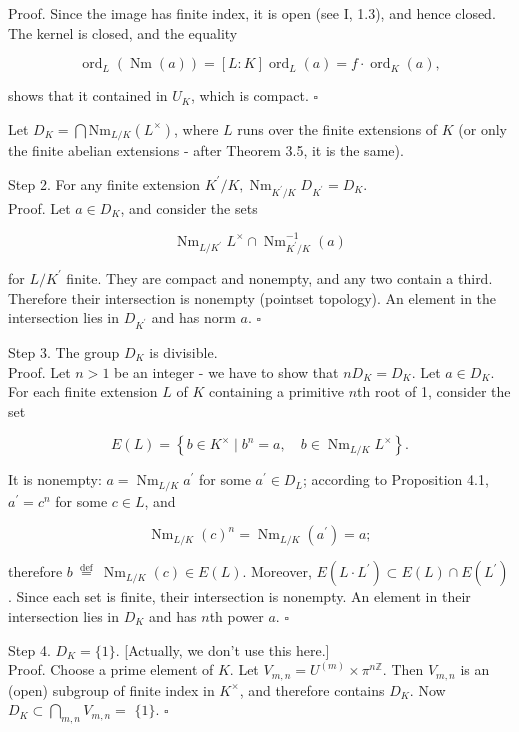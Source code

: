 \documentclass[10pt]{article}
\begin{document}
Proof. Since the image has finite index, it is open (see I, 1.3), and hence closed. The kernel is closed, and the equality

$$
\operatorname{ord}_{L}(\operatorname{Nm}(a))=[L: K] \operatorname{ord}_{L}(a)=f \cdot \operatorname{ord}_{K}(a),
$$

shows that it contained in $U_{K}$, which is compact. \(\square\)

Let $D_{K}=\bigcap \mathrm{Nm}_{L / K}\left(L^{\times}\right)$, where $L$ runs over the finite extensions of $K$ (or only the finite abelian extensions - after Theorem 3.5, it is the same).

Step 2. For any finite extension $K^{\prime} / K, \operatorname{Nm}_{K^{\prime} / K} D_{K^{\prime}}=D_{K}$.\\
Proof. Let $a \in D_{K}$, and consider the sets

$$
\operatorname{Nm}_{L / K^{\prime}} L^{\times} \cap \operatorname{Nm}_{K^{\prime} / K}^{-1}(a)
$$

for $L / K^{\prime}$ finite. They are compact and nonempty, and any two contain a third. Therefore their intersection is nonempty (pointset topology). An element in the intersection lies in $D_{K^{\prime}}$ and has norm $a$. \(\square\)

Step 3. The group $D_{K}$ is divisible.\\
Proof. Let $n>1$ be an integer - we have to show that $n D_{K}=D_{K}$. Let $a \in D_{K}$. For each finite extension $L$ of $K$ containing a primitive $n$th root of 1, consider the set

$$
E(L)=\left\{b \in K^{\times} \mid b^{n}=a, \quad b \in \operatorname{Nm}_{L / K} L^{\times}\right\} .
$$

It is nonempty: $a=\operatorname{Nm}_{L / K} a^{\prime}$ for some $a^{\prime} \in D_{L}$; according to Proposition 4.1, $a^{\prime}=c^{n}$ for some $c \in L$, and

$$
\operatorname{Nm}_{L / K}(c)^{n}=\operatorname{Nm}_{L / K}\left(a^{\prime}\right)=a ;
$$

therefore $b \stackrel{\text { def }}{=} \operatorname{Nm}_{L / K}(c) \in E(L)$. Moreover, $E\left(L \cdot L^{\prime}\right) \subset E(L) \cap E\left(L^{\prime}\right)$. Since each set is finite, their intersection is nonempty. An element in their intersection lies in $D_{K}$ and has $n$th power $a$. \(\square\)

Step 4. $D_{K}=\{1\}$. [Actually, we don't use this here.]\\
Proof. Choose a prime element of $K$. Let $V_{m, n}=U^{(m)} \times \pi^{n \mathbb{Z}}$. Then $V_{m, n}$ is an (open) subgroup of finite index in $K^{\times}$, and therefore contains $D_{K}$. Now $D_{K} \subset \bigcap_{m, n} V_{m, n}=$ $\{1\}$. \(\square\)
\end{document}
